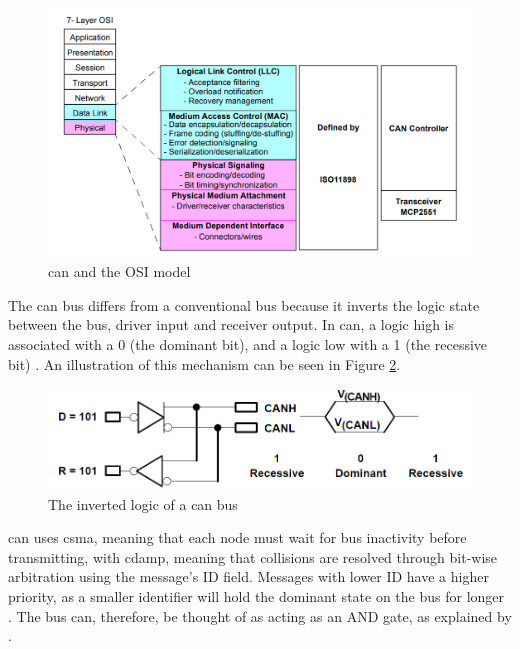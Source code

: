 \begin{figure}
    \centering
    \includegraphics[width = \textwidth]{img/parts/introduction/CAN ISO.png}
    \caption{\gls{can} and the OSI model \citep{Richards2002}}
    \label{fig:CAN_ISO}
\end{figure}

The \gls{can} bus differs from a conventional bus because it inverts the logic state between the bus, driver input and receiver output. In \gls{can}, a logic high is associated with a 0 (the dominant bit), and a logic low with a 1 (the recessive bit) \citep{Corrigan2002}. An illustration of this mechanism can be seen in Figure \ref{fig:CAN_Bus_Logic}.

\begin{figure}
    \centering
    \includegraphics[width = \textwidth]{img/parts/introduction/CAN Bus Logic.png}
    \caption{The inverted logic of a \gls{can} bus \citep{Corrigan2002}}
    \label{fig:CAN_Bus_Logic}
\end{figure}

\gls{can} uses \gls{csma}, meaning that each node must wait for bus inactivity before transmitting, with \gls{cdamp}, meaning that collisions are resolved through bit-wise arbitration using the message's ID field. Messages with lower ID have a higher priority, as a smaller identifier will hold the dominant state on the bus for longer \citep{Corrigan2002}. The bus can, therefore, be thought of as acting as an AND gate, as explained by \cite{Cook2008}.\par

